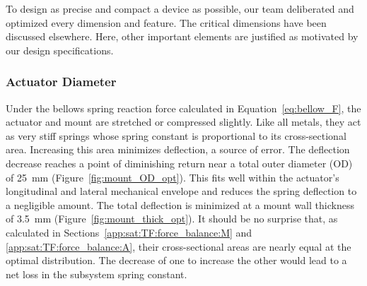 \documentclass[12pt, letterpaper]{report}%
\newcounter{mycounter}           %
\newcounter{sub}[mycounter]      %
\begin{document}
			To design as precise and compact a device as possible, our team deliberated and optimized every dimension and feature. The critical dimensions have been discussed elsewhere.
			Here, other important elements are justified as motivated by our design specifications.

			\subsubsection{Actuator Diameter}
			\label{subsubsec:design:just:gen_dim:act_diam}

				Under the bellows spring reaction force calculated in Equation~\eqref{eq:bellow_F}, the actuator and mount are stretched or compressed slightly.
				Like all metals, they act as very stiff springs whose spring constant is proportional to its cross-sectional area.
				Increasing this area minimizes deflection, a source of error.
				The deflection decrease reaches a point of diminishing return near a total outer diameter (OD) of \SI{25}{\milli\meter} (Figure~\ref{fig:mount_OD_opt}).
				This fits well within the actuator's longitudinal and lateral mechanical envelope and reduces the spring deflection to a negligible amount.
				The total deflection is minimized at a mount wall thickness of \SI{3.5}{\milli\meter} (Figure~\ref{fig:mount_thick_opt}).
				It should be no surprise that, as calculated in Sections~\ref{app:sat:TF:force_balance:M} and \ref{app:sat:TF:force_balance:A}, their cross-sectional areas are nearly equal at the optimal distribution.
				The decrease of one to increase the other would lead to a net loss in the subsystem spring constant.
\end{document}
